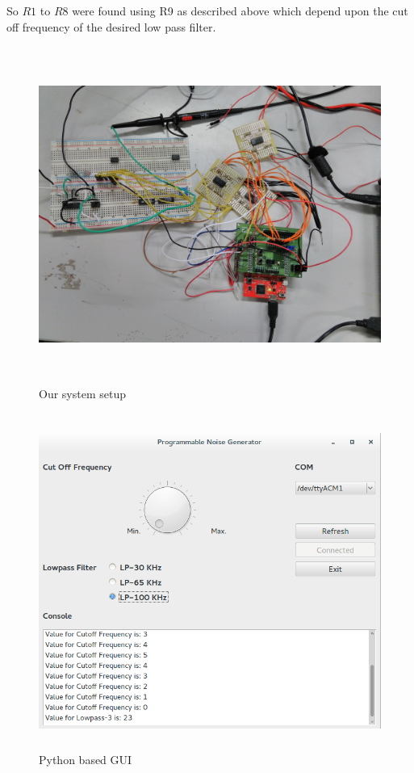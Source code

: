 \documentclass[a4paper,12pt]{article}
\begin{document}
So $R1$ to $R8$ were found using R9 as described above which depend upon the cut off frequency of the desired low pass filter.

\begin{figure}[!ht]
	\centering
	\includegraphics[width=\linewidth,height=11cm]{setup.jpg}
	\caption{Our system setup}
	\label{fig:setup}
\end{figure}

\begin{figure}[!ht]
	\centering
	\includegraphics[width=13cm,height=11cm]{gui.png}
	\caption{Python based GUI}
	\label{fig:gui}
\end{figure}
\end{document}
